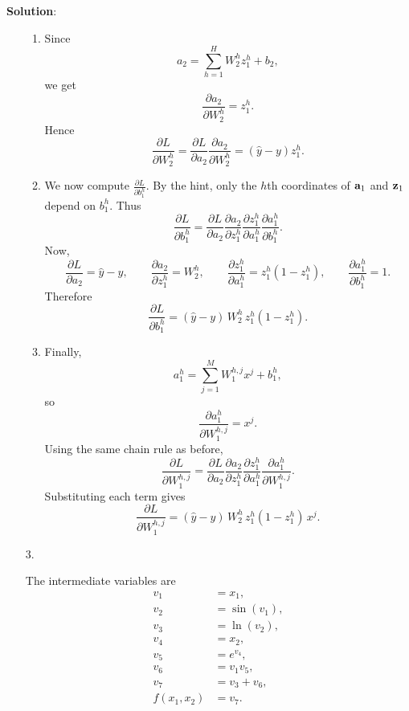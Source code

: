 \documentclass[submit]{harvardml}
\newenvironment{solution}{
    \vspace{2mm}
    \color{blue}\noindent\textbf{Solution}:
}{}
\begin{document}
\begin{solution}
\begin{enumerate}
\begin{enumerate}
        \item Since
        \[
        a_2 = \sum_{h=1}^H W_2^h z_1^h + b_2,
        \]
        we get
        \[
        \frac{\partial a_2}{\partial W_2^h} = z_1^h.
        \]
        Hence
        \[
        \frac{\partial L}{\partial W_2^h}
        =
        \frac{\partial L}{\partial a_2}
        \frac{\partial a_2}{\partial W_2^h}
        =
        (\hat{y} - y) z_1^h.
        \]

        \item We now compute $\frac{\partial L}{\partial b_1^h}$. By the hint, only the $h$th coordinates of $\bold{a}_1$ and $\bold{z}_1$ depend on $b_1^h$. Thus
        \[
        \frac{\partial L}{\partial b_1^h}
        =
        \frac{\partial L}{\partial a_2}
        \frac{\partial a_2}{\partial z_1^h}
        \frac{\partial z_1^h}{\partial a_1^h}
        \frac{\partial a_1^h}{\partial b_1^h}.
        \]
        Now,
        \[
        \frac{\partial L}{\partial a_2} = \hat{y}-y,
        \qquad
        \frac{\partial a_2}{\partial z_1^h} = W_2^h,
        \qquad
        \frac{\partial z_1^h}{\partial a_1^h} = z_1^h(1-z_1^h),
        \qquad
        \frac{\partial a_1^h}{\partial b_1^h} = 1.
        \]
        Therefore
        \[
        \frac{\partial L}{\partial b_1^h}
        =
        (\hat{y}-y)\,W_2^h\,z_1^h(1-z_1^h).
        \]

        \item Finally,
        \[
        a_1^h = \sum_{j=1}^M W_1^{h,j} x^j + b_1^h,
        \]
        so
        \[
        \frac{\partial a_1^h}{\partial W_1^{h,j}} = x^j.
        \]
        Using the same chain rule as before,
        \[
        \frac{\partial L}{\partial W_1^{h,j}}
        =
        \frac{\partial L}{\partial a_2}
        \frac{\partial a_2}{\partial z_1^h}
        \frac{\partial z_1^h}{\partial a_1^h}
        \frac{\partial a_1^h}{\partial W_1^{h,j}}.
        \]
        Substituting each term gives
        \[
        \frac{\partial L}{\partial W_1^{h,j}}
        =
        (\hat{y}-y)\,W_2^h\,z_1^h(1-z_1^h)\,x^j.
        \]
    \end{enumerate}

    \item[3.] 

    The intermediate variables are
    \begin{align*}
        v_1 &= x_1, \\
        v_2 &= \sin(v_1), \\
        v_3 &= \ln(v_2), \\
        v_4 &= x_2, \\
        v_5 &= e^{v_4}, \\
        v_6 &= v_1 v_5, \\
        v_7 &= v_3 + v_6, \\
        f(x_1,x_2) &= v_7.
    \end{align*}


\end{enumerate}
\end{solution}
\end{document}
